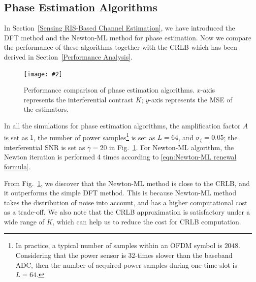 \documentclass[conference,10pt,twocolumn]{IEEEtran}
\theoremstyle{nonumberplain}
\newcommand{\myincludegraphics}[2][width=8.5cm]{\texttt{[image: \#2]}}
\begin{document}
\subsection{Phase Estimation Algorithms} \label{Phase Estimation Algorithms}
    In Section~\ref{Sensing RIS-Based Channel Estimation}, we have introduced the DFT method and the Newton-ML method for phase estimation. Now we compare the performance of these algorithms together with the CRLB which has been derived in Section~\ref{Performance Analysis}. 
    \begin{figure}[!t]
        \centering
        \myincludegraphics{data/pe_K-ML.pdf}
        \caption{Performance comparison of phase estimation algorithms. $x$-axis represents the interferential contrast $K$; $y$-axis represents the MSE of the estimators.}
        \label{fig:phase estimation_K}
    \end{figure}
    In all the simulations for phase estimation algorithms, the amplification factor $A$ is set as $1$, the number of power samples\footnote{In practice, a typical number of samples within an OFDM symbol is $2048$. Considering that the power sensor is 32-times slower than the baseband ADC, then the number of acquired power samples during one time slot is $L=64$.} is set as $L=64$, and $\sigma_\zeta=0.05$; the interferential SNR is set as $\bar{\gamma}=20$ in Fig.~\ref{fig:phase estimation_K}. 
    For Newton-ML algorithm, the Newton iteration is performed 4 times according to \eqref{eqn:Newton-ML renewal formula}. 

    From Fig.~\ref{fig:phase estimation_K}, we discover that the Newton-ML method is close to the CRLB, and it outperforms the simple DFT method. This is because Newton-ML method takes the distribution of noise into account, and has a higher computational cost as a trade-off. 
    We also note that the CRLB approximation is satisfactory under a wide range of $K$, which can help us to reduce the cost for CRLB computation.
\end{document}

